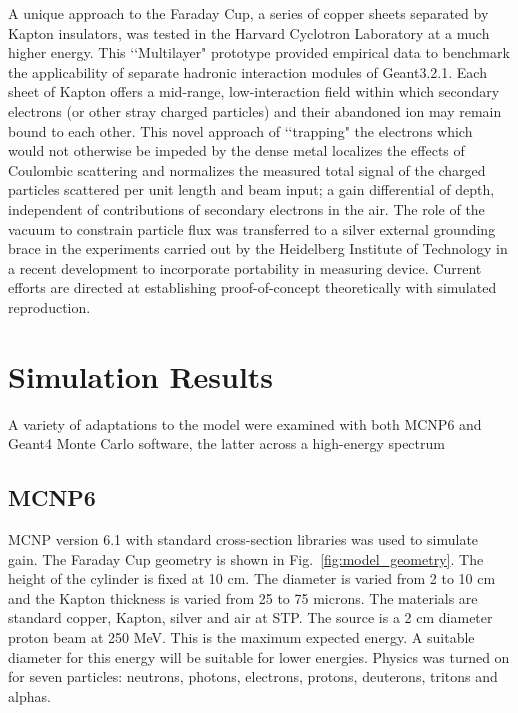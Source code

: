 \documentclass{mc2015}
\begin{document}
A unique approach to the Faraday Cup, a series of copper sheets separated by Kapton insulators, was tested in the Harvard Cyclotron Laboratory at a much higher energy.  This \lq\lq Multilayer" prototype provided empirical data to benchmark the applicability of separate hadronic interaction modules of Geant3.2.1. Each sheet of Kapton offers a mid-range, low-interaction field within which secondary electrons (or other stray charged particles) and their abandoned ion may remain bound to each other\cite{go99}.  This novel approach of \lq\lq trapping" the electrons which would not otherwise be impeded by the dense metal localizes the effects of Coulombic scattering and normalizes the measured total signal of the charged particles scattered per unit length and beam input; a gain differential of depth, independent of contributions of secondary electrons in the air.  The role of the vacuum to constrain particle flux was transferred to a silver external grounding brace in the experiments carried out by the Heidelberg Institute of Technology in a recent development to incorporate portability in measuring device.  Current efforts are directed at establishing proof-of-concept theoretically with simulated reproduction.

\section{Simulation Results}

A variety of adaptations to the model were examined with both MCNP6 and Geant4 Monte Carlo software, the latter across a high-energy spectrum 

\subsection{MCNP6}

MCNP version 6.1 with standard cross-section libraries was used to simulate gain. The Faraday Cup geometry is shown in Fig.~\ref{fig:model_geometry}. The height of the cylinder is fixed at 10 cm. The diameter is varied from 2 to 10 cm and the Kapton thickness is varied from 25 to 75 microns. The materials are standard copper, Kapton, silver and air at STP. The source is a 2 cm diameter proton beam at 250 MeV. This is the maximum expected energy. A suitable diameter for this energy will be suitable for lower energies. Physics was turned on for seven particles: neutrons, photons, electrons, protons, deuterons, tritons and alphas.
\end{document}
